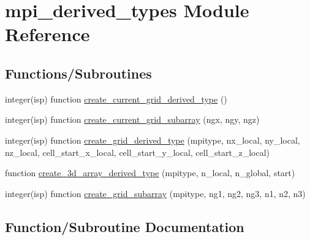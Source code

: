 \hypertarget{namespacempi__derived__types}{}\section{mpi\+\_\+derived\+\_\+types Module Reference}
\label{namespacempi__derived__types}
\subsection*{Functions/\+Subroutines}
\begin{DoxyCompactItemize}
\item 
integer(isp) function \hyperlink{namespacempi__derived__types_a4e591316977c3fa41e3cc0702f6adcf4}{create\+\_\+current\+\_\+grid\+\_\+derived\+\_\+type} ()
\item 
integer(isp) function \hyperlink{namespacempi__derived__types_a7c5a0ff3b29c3edc9345259a18039046}{create\+\_\+current\+\_\+grid\+\_\+subarray} (ngx, ngy, ngz)
\item 
integer(isp) function \hyperlink{namespacempi__derived__types_add427b42c00be9acdf56944f2d55e6e2}{create\+\_\+grid\+\_\+derived\+\_\+type} (mpitype, nx\+\_\+local, ny\+\_\+local, nz\+\_\+local,                   cell\+\_\+start\+\_\+x\+\_\+local, cell\+\_\+start\+\_\+y\+\_\+local, cell\+\_\+start\+\_\+z\+\_\+local)
\item 
function \hyperlink{namespacempi__derived__types_a4c632b371019f467fc3544ee8a93ff10}{create\+\_\+3d\+\_\+array\+\_\+derived\+\_\+type} (mpitype, n\+\_\+local, n\+\_\+global, start)
\item 
integer(isp) function \hyperlink{namespacempi__derived__types_aff1cd1875ad7e3e496b073d20fe156d7}{create\+\_\+grid\+\_\+subarray} (mpitype, ng1, ng2, ng3, n1, n2, n3)
\end{DoxyCompactItemize}


\subsection{Function/\+Subroutine Documentation}
